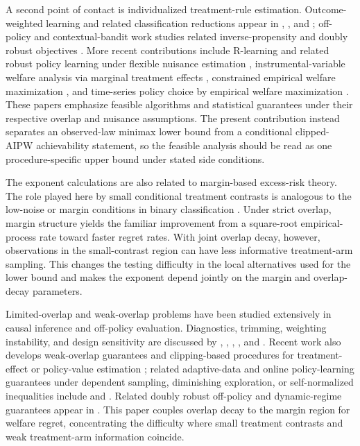 \documentclass[11pt]{article}
\begin{document}
A second point of contact is individualized treatment-rule estimation.  Outcome-weighted learning and related classification reductions appear in \citet{Qian2011}, \citet{Zhao2012}, and \citet{Zhang2012}; off-policy and contextual-bandit work studies related inverse-propensity and doubly robust objectives \citep{Dudik2011,Swaminathan2015,Kallus2017}.  More recent contributions include R-learning and related robust policy learning under flexible nuisance estimation \citep{Nie2021,Athey2021}, instrumental-variable welfare analysis via marginal treatment effects \citep{Sasaki2020}, constrained empirical welfare maximization \citep{Sun2021}, and time-series policy choice by empirical welfare maximization \citep{Kitagawa2022}.  These papers emphasize feasible algorithms and statistical guarantees under their respective overlap and nuisance assumptions.  The present contribution instead separates an observed-law minimax lower bound from a conditional clipped-AIPW achievability statement, so the feasible analysis should be read as one procedure-specific upper bound under stated side conditions.

The exponent calculations are also related to margin-based excess-risk theory.  The role played here by small conditional treatment contrasts is analogous to the low-noise or margin conditions in binary classification \citep{Audibert2007,Massart2006,Tsybakov2009}.  Under strict overlap, margin structure yields the familiar improvement from a square-root empirical-process rate toward faster regret rates.  With joint overlap decay, however, observations in the small-contrast region can have less informative treatment-arm sampling.  This changes the testing difficulty in the local alternatives used for the lower bound and makes the exponent depend jointly on the margin and overlap-decay parameters.

Limited-overlap and weak-overlap problems have been studied extensively in causal inference and off-policy evaluation.  Diagnostics, trimming, weighting instability, and design sensitivity are discussed by \citet{Li2016}, \citet{DAmour2017}, \citet{BenMichael2022}, \citet{Hill2024}, and \citet{Susmann2025}.  Recent work also develops weak-overlap guarantees and clipping-based procedures for treatment-effect or policy-value estimation \citep{Zhao2023,Liu2026}; related adaptive-data and online policy-learning guarantees under dependent sampling, diminishing exploration, or self-normalized inequalities include \citet{Zhan2021} and \citet{Girard2025}.
Related doubly robust off-policy and dynamic-regime guarantees appear in \citet{Chen2020,Sakaguchi2024}.  This paper couples overlap decay to the margin region for welfare regret, concentrating the difficulty where small treatment contrasts and weak treatment-arm information coincide.
\end{document}
